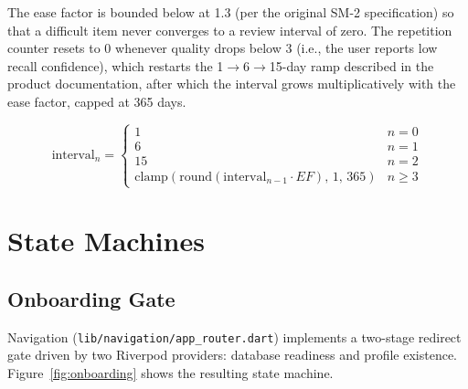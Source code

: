 \documentclass[11pt,a4paper]{article}
\begin{document}
The ease factor is bounded below at 1.3 (per the original SM-2 specification) so that a difficult item never converges to a review interval of zero. The repetition counter resets to 0 whenever quality drops below 3 (i.e., the user reports low recall confidence), which restarts the 1$\rightarrow$6$\rightarrow$15-day ramp described in the product documentation, after which the interval grows multiplicatively with the ease factor, capped at 365 days.

\begin{equation}
\text{interval}_{n} =
\begin{cases}
1 & n = 0\\
6 & n = 1\\
15 & n = 2\\
\mathrm{clamp}\!\left(\mathrm{round}(\text{interval}_{n-1}\cdot EF),\,1,\,365\right) & n \geq 3
\end{cases}
\end{equation}

\section{State Machines}

\subsection{Onboarding Gate}
Navigation (\texttt{lib/navigation/app\_router.dart}) implements a two-stage redirect gate driven by two Riverpod providers: database readiness and profile existence. Figure~\ref{fig:onboarding} shows the resulting state machine.
\end{document}

